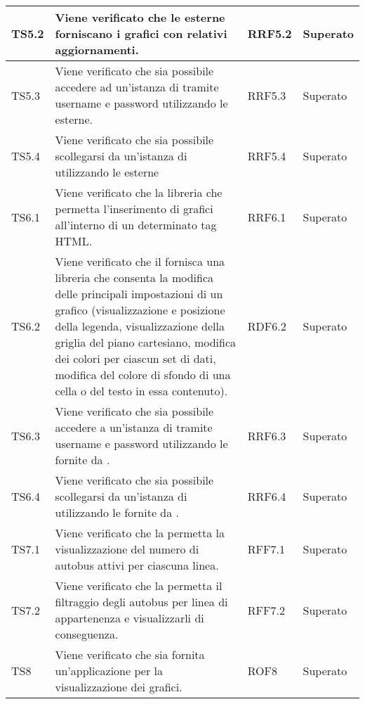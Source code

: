\begin{longtabu}{| X[0.5] | X | X[0.5] | X[0.4] |}
TS5.2 & Viene verificato che le  esterne forniscano i grafici con relativi aggiornamenti. & RRF5.2 & Superato\\ \hline

TS5.3 & Viene verificato che sia possibile accedere ad un'istanza di  tramite username e password utilizzando le  esterne. & RRF5.3 & Superato\\ \hline

TS5.4 & Viene verificato che sia possibile scollegarsi da un'istanza di  utilizzando le  esterne & RRF5.4 & Superato\\ \hline

TS6.1 & Viene verificato che la libreria che permetta l'inserimento di grafici all'interno di un determinato tag HTML. & RRF6.1 & Superato\\ \hline

TS6.2 & Viene verificato che il  fornisca una libreria che consenta la modifica delle principali impostazioni di un grafico (visualizzazione e posizione della legenda, visualizzazione della griglia del piano cartesiano, modifica dei colori per ciascun set di dati, modifica del colore di sfondo di una cella o del testo in essa contenuto). & RDF6.2 & Superato\\ \hline

TS6.3 & Viene verificato che sia possibile accedere a un'istanza di  tramite username e password utilizzando le  fornite da . & RRF6.3 & Superato\\ \hline

TS6.4 & Viene verificato che sia possibile scollegarsi da un'istanza di  utilizzando le  fornite da . & RRF6.4 & Superato\\ \hline

TS7.1 & Viene verificato che la  permetta la visualizzazione del numero di autobus attivi per ciascuna linea. & RFF7.1 & Superato\\ \hline

TS7.2 & Viene verificato che la  permetta il filtraggio degli autobus per linea di appartenenza e visualizzarli di conseguenza. & RFF7.2 & Superato\\ \hline

TS8 & Viene verificato che sia fornita un'applicazione  per la visualizzazione dei grafici. & ROF8 & Superato\\ \hline


\end{longtabu}

